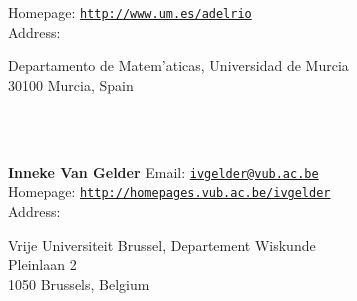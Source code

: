\documentclass[a4paper,11pt]{report}
\begin{document}
\begin{titlepage}
{  Homepage: \href{http://www.um.es/adelrio} {\texttt{http://www.um.es/adelrio}}\\
  Address: \begin{minipage}[t]{8cm}\noindent
 Departamento de Matem{\a'a}ticas, Universidad de Murcia\\
 30100 Murcia, Spain \end{minipage}
}\\
{\mbox{}\\
\small \noindent \textbf{Inneke Van Gelder    }  Email: \href{mailto://ivgelder@vub.ac.be} {\texttt{ivgelder@vub.ac.be}}\\
  Homepage: \href{http://homepages.vub.ac.be/~ivgelder} {\texttt{http://homepages.vub.ac.be/\texttt{}ivgelder}}\\
  Address: \begin{minipage}[t]{8cm}\noindent
 Vrije Universiteit Brussel, Departement Wiskunde \\
 Pleinlaan 2 \\
 1050 Brussels, Belgium \end{minipage}
}\\
\end{titlepage}
\end{document}
